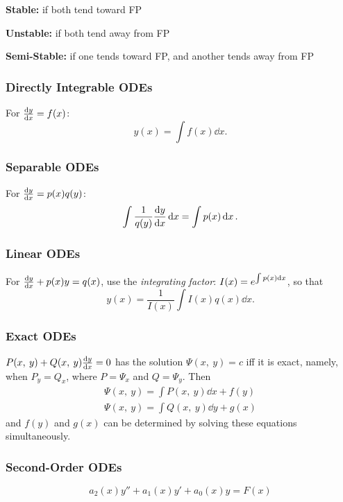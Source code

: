\documentclass{article}
\begin{document}
\begin{multicols}{3}
    \textbf{Stable:} if both tend toward FP

    \textbf{Unstable:} if both tend away from FP

    \textbf{Semi-Stable:} if one tends toward FP, and another tends away from FP
    \subsubsection*{Directly Integrable ODEs}
    For $\dv{y}{x} = f(x)$:
    \begin{equation*}
        y(x) = \int f(x) \dd{x}.
    \end{equation*}
    \subsubsection*{Separable ODEs}
    For $\dv{y}{x} = p(x) q(y)$:
    \begin{equation*}
        \int \frac{1}{q(y)} \dv{y}{x} \dd{x} = \int p(x) \dd{x}.
    \end{equation*}
    \subsubsection*{Linear ODEs}
    For $\dv{y}{x} + p(x)y = q(x)$, use the \textit{integrating factor}:
    $I(x) = e^{\int p(x) \dd{x}}$, so that
    \begin{equation*}
        y(x) = \frac{1}{I(x)} \int I(x) q(x) \dd{x}.
    \end{equation*}
    \subsubsection*{Exact ODEs}
    $P(x,\: y) + Q(x,\: y)\dv{y}{x} = 0$
    has the solution
    $\Psi(x,\: y) = c$
    iff it is exact, namely, when
    $P_y = Q_x$,
    where $P = \Psi_x$ and $Q = \Psi_y$. Then
    \begin{gather*}
        \Psi(x,\: y) = \int P(x,\: y) \dd{x} + f(y) \\
        \Psi(x,\: y) = \int Q(x,\: y) \dd{y} + g(x)
    \end{gather*}
    and $f(y)$ and $g(x)$ can be determined by solving these equations simultaneously.
    \subsubsection*{Second-Order ODEs}
    \begin{equation*}
        a_2(x)y'' + a_1(x)y' + a_0(x)y = F(x)
    \end{equation*}

\end{multicols}
\end{document}
